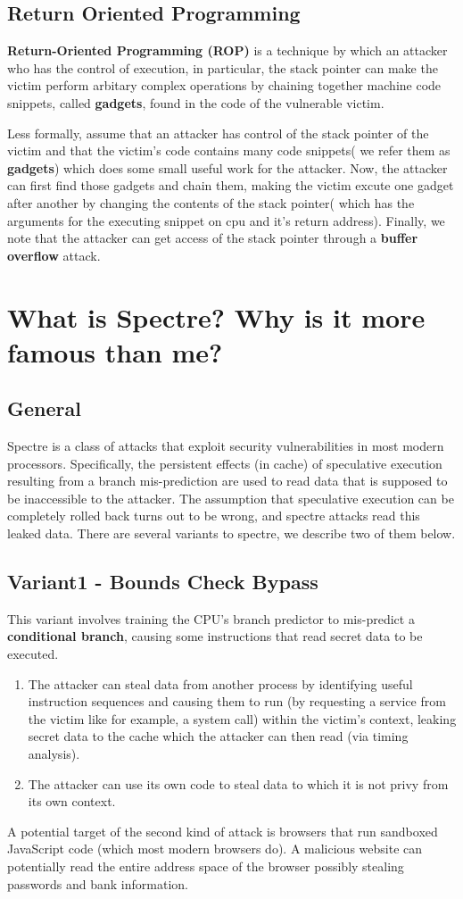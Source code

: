 \documentclass[12pt]{article}
\begin{document}
\subsection{Return Oriented Programming}
\textbf{Return-Oriented Programming (ROP)} is a technique by which an attacker who has the control of execution, in particular, the stack pointer can make the victim perform arbitary complex operations by chaining together machine code snippets, called \textbf{gadgets}, found in the code of the vulnerable victim.

Less formally, assume that an attacker has control of the stack pointer of the victim and that the  victim's code contains many code snippets( we refer them as \textbf{gadgets}) which does some small useful work for the attacker. Now, the attacker can first find those gadgets and chain them, making the victim excute one gadget after another by changing the contents of the stack pointer( which has the arguments for the executing snippet on cpu and it's return address). Finally, we note that the attacker can get access of the stack pointer through a  \textbf{buffer overflow} attack.
\section{What is Spectre? Why is it more famous than me?}
\subsection{General}
Spectre is a class of attacks that exploit security vulnerabilities in most modern processors. Specifically, the persistent effects (in cache) of speculative execution resulting from a branch mis-prediction are used to read data that is supposed to be inaccessible to the attacker. The assumption that speculative execution can be completely rolled back turns out to be wrong, and spectre attacks read this leaked data. There are several variants to spectre, we describe two of them below.
\subsection{Variant1 - Bounds Check Bypass}
This variant involves training the CPU's branch predictor to mis-predict a \textbf{conditional branch}, causing some instructions that read secret data to be executed. 
\begin{enumerate}
    \item The attacker can steal data from another process by identifying useful instruction sequences and causing them to run (by requesting a service from the victim like for example, a system call) within the victim's context, leaking secret data to the cache which the attacker can then read (via timing analysis). \item The attacker can use its own code to steal data to which it is not privy from its own context.
\end{enumerate}
 A potential target of the second kind of attack is browsers that run sandboxed JavaScript code (which most modern browsers do). A malicious website can potentially read the entire address space of the browser possibly stealing passwords and bank information.
\end{document}
